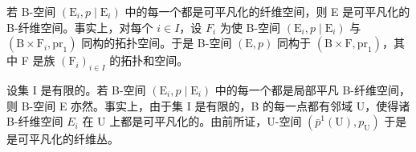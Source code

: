 若 B-空间 \((\mathrm{E}_{i}, p \mid \mathrm{E}_{i})\) 中的每一个都是可平凡化的纤维空间，则 E 是可平凡化的 B-纤维空间。事实上，对每个 \(i \in I\)，设 \(F_{i}\) 为使 B-空间 \((\mathrm{E}_{i}, p \mid \mathrm{E}_{i})\) 与 \((\mathrm{B} \times \mathrm{F}_{i}, \mathrm{pr}_{1})\) 同构的拓扑空间。于是 B-空间 \((\mathrm{E}, p)\) 同构于 \((\mathrm{B} \times \mathrm{F}, \mathrm{pr}_{1})\)，其中 F 是族 \((\mathrm{F}_{i})_{i \in I}\) 的拓扑和空间。

设集 I 是有限的。若 B-空间 \((\mathrm{E}_{i}, p \mid \mathrm{E}_{i})\) 中的每一个都是局部平凡 B-纤维空间，则 B-空间 E 亦然。事实上，由于集 I 是有限的，B 的每一点都有邻域 U，使得诸 B-纤维空间 \(E_{i}\) 在 U 上都是可平凡化的。由前所证，U-空间 \((\bar{p}^{1}(\mathrm{U}), p_{\mathrm{U}})\) 于是是可平凡化的纤维丛。

